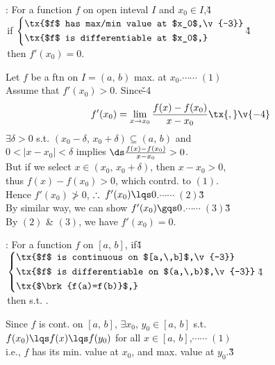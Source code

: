 \documentclass[dvipdfmx,a4paper,titlepage,9pt]{jsarticle}
\begin{document}
\begin{multicols*}{2}
\newpage



: For a function $f$ on open inteval $I$ and $x_0\in I$,\v4\\
\;\;\;\;\;\,if $\left\{\begin{aligned}&\tx{$f$ has max/min value at $x_0$,\v{-3}}\\&\tx{$f$ is differentiable at $x_0$,}\end{aligned}\right.$\v4\\
\;\;\;\;\;\,then $f'(x_0)=0$.

\begin{Pfbox}
Let $f$ be a ftn on $I=(a,\,b)$ max. at $x_0$.\hfill$\cdots\cdots\;(1)$\\
Assume that $f'(x_0)>0$. Since\v{-4}
$$f'(x_0)=\lim_{x\to x_0}\frac{f(x)-f(x_0)}{x-x_0}\tx{,}\v{-4}$$
$\exists\delta>0$ s.t. $(x_0-\delta,\,x_0+\delta)\subseteq(a,\,b)$ and\\
$0<|x-x_0|<\delta$ implies $\ds\frac{f(x)-f(x_0)}{x-x_0}>0$.\\
But if we select $x\in(x_0,\,x_0+\delta)$, then $x-x_0>0$,\\
thus $f(x)-f(x_0)>0$, which contrd. to $(1)$.\\
Hence $f'(x_0)\not>0$, $\therefore\;f'(x_0)\lqs0$.\hfill$\cdots\cdots\;(2)$\v3\\
By similar way, we can show $f'(x_0)\gqs0$.\hfill$\cdots\cdots\;(3)$\v3\\
By $(2)$ \& $(3)$, we have $f'(x_0)=0$.
\end{Pfbox}\;


: For a function $f$ on $[a,\,b]$, if\v4\\
\;\;\;\;\;\,$\left\{\begin{aligned}&\tx{$f$ is continuous on $[a,\,b]$,\v{-3}}\\&\tx{$f$ is differentiable on $(a,\,b)$,\v{-3}}\\&\tx{$\brk{f(a)=f(b)}$,}\end{aligned}\right.$\v4\\
\;\;\;\;\;\,then  s.t. .

\begin{Pfbox}
Since $f$ is cont. on $[a,\,b]$, $\exists x_0$, $y_0\in[a,\,b]$ s.t.\\
$f(x_0)\lqs f(x)\lqs f(y_0)$ for all $x\in[a,\,b]$,\hfill$\cdots\cdots\;(1)$\\
i.e., $f$ has its min. value at $x_0$, and max. value at $y_0$.\v3


\end{Pfbox}
\end{multicols*}
\end{document}
